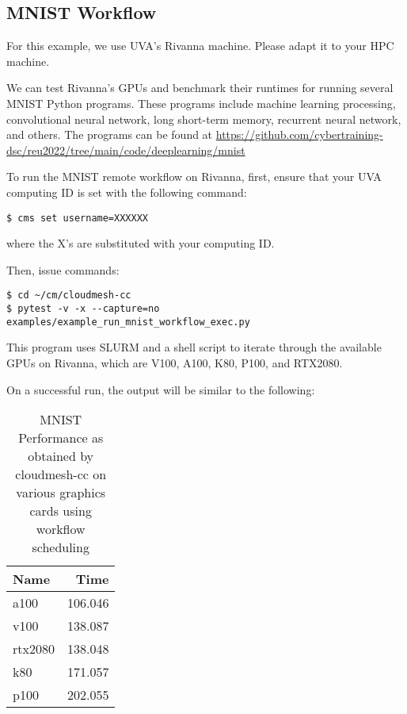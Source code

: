 
\subsection{MNIST Workflow}\label{mnist-workflow}

For this example, we use UVA's Rivanna machine. Please adapt it to your
HPC machine.

We can test Rivanna's GPUs and benchmark their runtimes for running
several MNIST Python programs. These programs include machine learning
processing, convolutional neural network, long short-term memory,
recurrent neural network, and others. The programs can be found at
\url{https://github.com/cybertraining-dsc/reu2022/tree/main/code/deeplearning/mnist}

To run the MNIST remote workflow on Rivanna, first, ensure that your UVA
computing ID is set with the following command:

\smallskip
\begin{verbatim}
$ cms set username=XXXXXX
\end{verbatim}
\smallskip

where the X's are substituted with your computing ID.

Then, issue commands:

\smallskip
\begin{verbatim}
$ cd ~/cm/cloudmesh-cc
$ pytest -v -x --capture=no examples/example_run_mnist_workflow_exec.py
\end{verbatim}
\smallskip

This program uses SLURM and a shell script to iterate through the
available GPUs on Rivanna, which are V100, A100, K80, P100, and RTX2080.

On a successful run, the output will be similar to the following:

\begin{table}[!ht]
\caption{MNIST Performance as obtained by cloudmesh-cc on various graphics cards using workflow scheduling}
    \centering
    \begin{tabular}{lr}
    \hline
        Name & Time \\ \hline
        a100 & 106.046 \\ 
        v100 & 138.087 \\ 
        rtx2080 & 138.048 \\
        k80 & 171.057 \\ 
        p100 & 202.055 \\
    \end{tabular}
    \label{table:mnist-times}
  \end{table}
  
